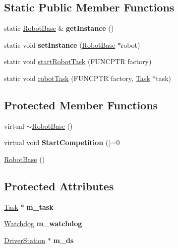 \subsection*{\-Static \-Public \-Member \-Functions}
\begin{DoxyCompactItemize}
\item 
\hypertarget{classRobotBase_a033b604c5513471b426655c125ec9c17}{static \hyperlink{classRobotBase}{\-Robot\-Base} \& {\bfseries get\-Instance} ()}\label{classRobotBase_a033b604c5513471b426655c125ec9c17}

\item 
\hypertarget{classRobotBase_a2bc3fec3a452f5aaaa3d13b06dfc4798}{static void {\bfseries set\-Instance} (\hyperlink{classRobotBase}{\-Robot\-Base} $\ast$robot)}\label{classRobotBase_a2bc3fec3a452f5aaaa3d13b06dfc4798}

\item 
static void \hyperlink{classRobotBase_a17eddc47e75e82e61b89afc9f6ce3fcb}{start\-Robot\-Task} (\-F\-U\-N\-C\-P\-T\-R factory)
\item 
static void \hyperlink{classRobotBase_a005838dfd01d67d0b5947d3f5bbac0fe}{robot\-Task} (\-F\-U\-N\-C\-P\-T\-R factory, \hyperlink{classTask}{\-Task} $\ast$task)
\end{DoxyCompactItemize}
\subsection*{\-Protected \-Member \-Functions}
\begin{DoxyCompactItemize}
\item 
virtual \hyperlink{classRobotBase_a2229cb79a79e0f4fc9fd600e33740a04}{$\sim$\-Robot\-Base} ()
\item 
\hypertarget{classRobotBase_a4eadc124fd0004a681055a51223a4c7a}{virtual void {\bfseries \-Start\-Competition} ()=0}\label{classRobotBase_a4eadc124fd0004a681055a51223a4c7a}

\item 
\hyperlink{classRobotBase_a3043a0a78f4ec0e1e449eeed0a5db6e5}{\-Robot\-Base} ()
\end{DoxyCompactItemize}
\subsection*{\-Protected \-Attributes}
\begin{DoxyCompactItemize}
\item 
\hypertarget{classRobotBase_a213426ebf60e0d6987c801f44323e179}{\hyperlink{classTask}{\-Task} $\ast$ {\bfseries m\-\_\-task}}\label{classRobotBase_a213426ebf60e0d6987c801f44323e179}

\item 
\hypertarget{classRobotBase_aaec2f8b8d1f42b6ab500ae2ea6dd6dbe}{\hyperlink{classWatchdog}{\-Watchdog} {\bfseries m\-\_\-watchdog}}\label{classRobotBase_aaec2f8b8d1f42b6ab500ae2ea6dd6dbe}

\item 
\hypertarget{classRobotBase_ae9b4f4ce5604f2ca54e549ae1bf8f3ff}{\hyperlink{classDriverStation}{\-Driver\-Station} $\ast$ {\bfseries m\-\_\-ds}}\label{classRobotBase_ae9b4f4ce5604f2ca54e549ae1bf8f3ff}

\end{DoxyCompactItemize}
